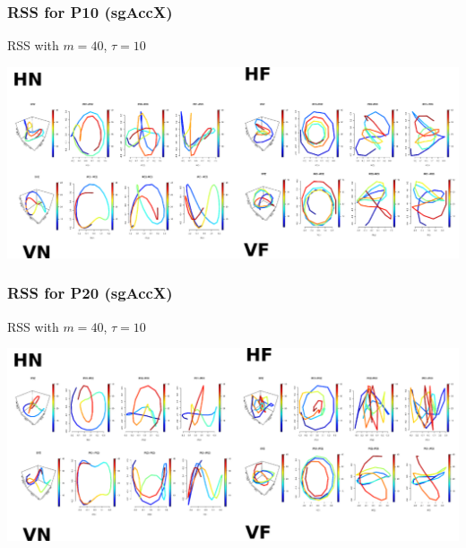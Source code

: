 \documentclass{beamer}
\begin{document}
\begin{frame}
\frametitle{RSS for P10 (sgAccX)}

RSS with $m=40$, $\tau=10$
\begin{adjustwidth}{-3em}{-3em}
\includegraphics[width=1.2\textwidth]{Humans_p10rss}
\end{adjustwidth}

\end{frame}



\begin{frame}
\frametitle{RSS for P20 (sgAccX)}

RSS with $m=40$, $\tau=10$
\begin{adjustwidth}{-3em}{-3em}
\includegraphics[width=1.2\textwidth]{Humans_p20rss}
\end{adjustwidth}

\end{frame}
\end{document}
